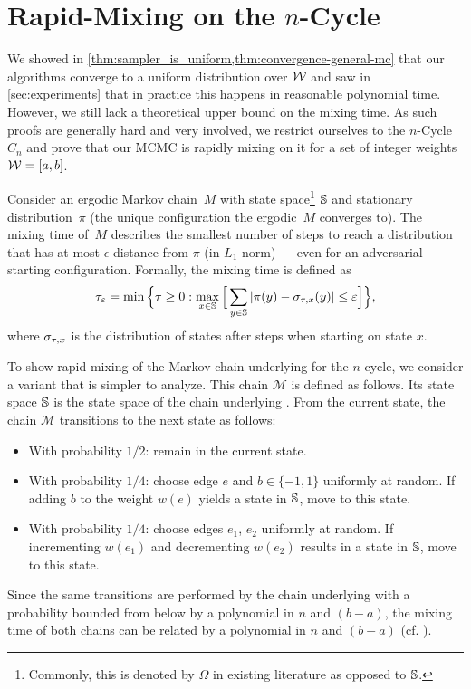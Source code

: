 \section{Rapid-Mixing on the $n$-Cycle~\cite{RNEW}}\label{sec:rapid-mixing}
We showed in \cref{thm:sampler_is_uniform,thm:convergence-general-mc} that our algorithms converge to a uniform distribution over $\mathcal W$ and saw in \cref{sec:experiments} that in practice this happens in reasonable polynomial time.
However, we still lack a theoretical upper bound on the mixing time.
As such proofs are generally hard and very involved, we restrict ourselves to the $n$-Cycle $C_n$ and prove that our MCMC is rapidly mixing on it for a set of integer weights $\mathcal W = [a,b]$.

Consider an ergodic Markov chain~$M$ with state space\footnote{
    Commonly, this is denoted by $\Omega$ in existing literature as opposed to $\mathbb S$.    
} $\mathbb S$ and stationary distribution~$\pi$ (\ie the unique configuration the ergodic~$M$ converges to).
The mixing time \mixtime of~$M$ describes the smallest number of steps to reach a distribution that has at most $\epsilon$ distance from $\pi$ (in $L_1$ norm) --- even for an adversarial starting configuration.
Formally, the mixing time is defined as
$$
\tau_{\varepsilon} = \min \Big\{ \tau \geq 0 : \max_{x \in \mathbb S} \Big[ \sum_{y \in \mathbb S} |\pi(y) - \sigma_{\tau,x}(y)| \leq \varepsilon \Big] \Big\},
$$
where $\sigma_{\tau,x}$ is the distribution of states after \steps steps when starting on state $x$. 

To show rapid mixing of the Markov chain underlying  for the $n$-cycle, we consider a variant that is simpler to analyze.
This chain $\mathcal{M}$ is defined as follows.
Its state space $\mathbb S$ is the state space of the chain underlying .
From the current state, the chain $\mathcal{M}$ transitions to the next state as follows:
\begin{itemize}
	\item With probability $1 / 2$: remain in the current state.
	\item With probability $1 / 4$: choose edge $e$ and $b \in \{-1, 1\}$ uniformly at random.
    If adding $b$ to the weight $w(e)$ yields a state in $\mathbb S$, move to this state.
	\item With probability $1 / 4$: choose edges $e_1$, $e_2$ uniformly at random.
    If incrementing $w(e_1)$ and decrementing $w(e_2)$ results in a state in $\mathbb S$, move to this state.
\end{itemize}
Since the same transitions are performed by the chain underlying  with a probability bounded from below by a polynomial in $n$ and $(b - a)$, the mixing time of both chains can be related by a polynomial in $n$ and $(b - a)$ (cf. \cite[Remark 13.19]{levin2017markov}).

